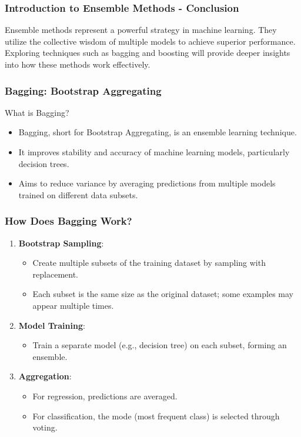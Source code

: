 \documentclass{beamer}
\begin{document}
\begin{frame}[fragile]
    \frametitle{Introduction to Ensemble Methods - Conclusion}
    Ensemble methods represent a powerful strategy in machine learning. They utilize the collective wisdom of multiple models to achieve superior performance. Exploring techniques such as bagging and boosting will provide deeper insights into how these methods work effectively.
\end{frame}

\begin{frame}[fragile]
    \frametitle{Bagging: Bootstrap Aggregating}
    \begin{block}{What is Bagging?}
        \begin{itemize}
            \item Bagging, short for Bootstrap Aggregating, is an ensemble learning technique.
            \item It improves stability and accuracy of machine learning models, particularly decision trees.
            \item Aims to reduce variance by averaging predictions from multiple models trained on different data subsets.
        \end{itemize}
    \end{block}
\end{frame}

\begin{frame}[fragile]
    \frametitle{How Does Bagging Work?}
    \begin{enumerate}
        \item \textbf{Bootstrap Sampling}:
            \begin{itemize}
                \item Create multiple subsets of the training dataset by sampling with replacement.
                \item Each subset is the same size as the original dataset; some examples may appear multiple times.
            \end{itemize}
        \item \textbf{Model Training}:
            \begin{itemize}
                \item Train a separate model (e.g., decision tree) on each subset, forming an ensemble.
            \end{itemize}
        \item \textbf{Aggregation}:
            \begin{itemize}
                \item For regression, predictions are averaged.
                \item For classification, the mode (most frequent class) is selected through voting.
            \end{itemize}
    \end{enumerate}
\end{frame}
\end{document}
